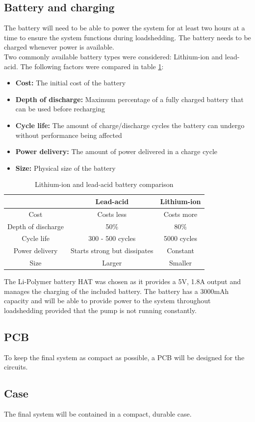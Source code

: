 \subsection{Battery and charging}
The battery will need to be able to power the system for at least two hours at a time to ensure the system functions during loadshedding. The battery needs to be charged whenever power is available. 
\\

Two commonly available battery types were considered: Lithium-ion and lead-acid. The following factors were compared in table \ref{tab:battery_comp}: 

\begin{itemize}
    \item \textbf{Cost:} The initial cost of the battery
    \item \textbf{Depth of discharge:} Maximum percentage of a fully charged battery that can be used before recharging
    \item \textbf{Cycle life:} The amount of charge/discharge cycles the battery can undergo without performance being affected
    \item \textbf{Power delivery:} The amount of power delivered in a charge cycle
    \item \textbf{Size:} Physical size of the battery
\end{itemize}

\begin{table}[!h]
    \centering
    \begin{tabular}{|c||c|c|}
        \hline
         &  Lead-acid & Lithium-ion \\
        \hline
        Cost & Costs less & Costs more \\
        Depth of discharge \cite{battery_10_diff} & 50\% & 80\% \\
        Cycle life \cite{battery_10_diff} & 300 - 500 cycles & 5000 cycles \\
        Power delivery \cite{battery_guide} & Starts strong but dissipates & Constant \\
        Size \cite{battery_10_diff} & Larger & Smaller \\
        \hline
    \end{tabular}
    \caption{Lithium-ion and lead-acid battery comparison}
    \label{tab:battery_comp}
\end{table}

The Li-Polymer battery HAT was chosen as it provides a 5V, 1.8A output \cite{battery_faq} and manages the charging of the included battery. The battery has a 3000mAh capacity and will be able to provide power to the system throughout loadshedding provided that the pump is not running constantly.

\subsection{PCB}
To keep the final system as compact as possible, a PCB will be designed for the circuits.

\subsection{Case}
The final system will be contained in a compact, durable case.